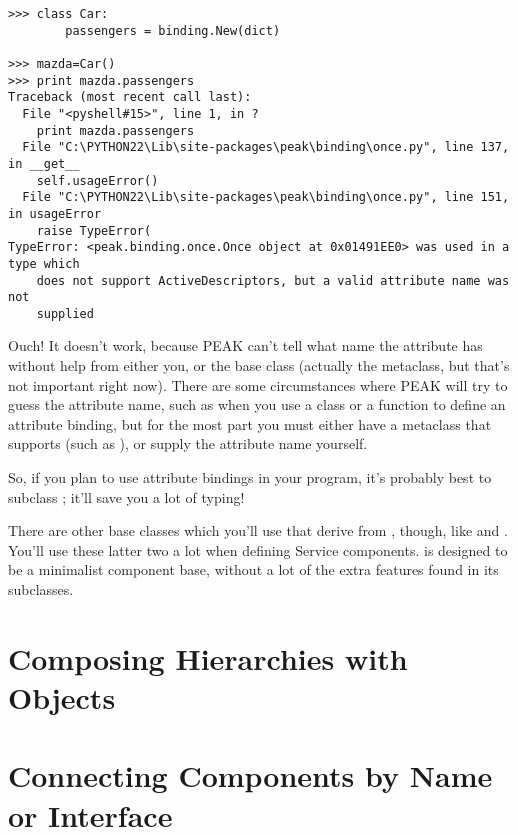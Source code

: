 \begin{verbatim}
>>> class Car:
        passengers = binding.New(dict)
	
>>> mazda=Car()
>>> print mazda.passengers
Traceback (most recent call last):
  File "<pyshell#15>", line 1, in ?
    print mazda.passengers
  File "C:\PYTHON22\Lib\site-packages\peak\binding\once.py", line 137, in __get__
    self.usageError()
  File "C:\PYTHON22\Lib\site-packages\peak\binding\once.py", line 151, in usageError
    raise TypeError(
TypeError: <peak.binding.once.Once object at 0x01491EE0> was used in a type which
    does not support ActiveDescriptors, but a valid attribute name was not
    supplied

\end{verbatim}

Ouch!  It doesn't work, because PEAK can't tell what name the attribute
has without help from either you, or the base class (actually the metaclass,
but that's not important right now).  There are some circumstances where PEAK
will try to guess the attribute name, such as when you use a class or a 
function to define an attribute binding, but for the most part you must either
have a metaclass that supports  (such as 
), or supply the attribute name yourself.

So, if you plan to use attribute bindings in your program, it's probably best
to subclass ; it'll save you a lot of typing!

There are other  base classes which you'll use that
derive from , though, like  and
.  You'll use these latter two a lot when defining
Service components.   is designed to be a minimalist
component base, without a lot of the extra features found in its subclasses.







\section{Composing Hierarchies with  Objects}



\section{Connecting Components by Name or Interface}

